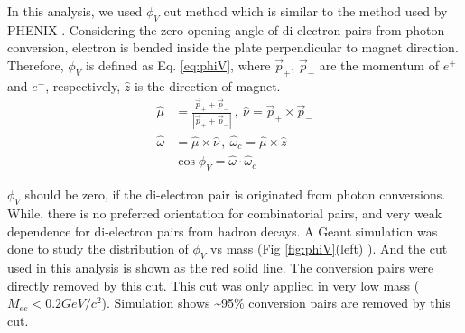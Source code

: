 In this analysis, we used $\phi_{V}$ cut method which is similar
to the method used by PHENIX \cite{PhysRevC.81.034911}. Considering
the zero opening angle of di-electron pairs from photon conversion,
electron is bended inside the plate perpendicular to magnet direction.
Therefore, $\phi_{V}$ is defined as Eq. \ref{eq:phiV}, where $\vec{p}_{+}$,
$\vec{p}_{-}$ are the momentum of $e^{+}$ and $e^{-}$, respectively,
$\hat{z}$ is the direction of magnet.
\begin{align}
\hat{\mu} & =\frac{\vec{p}_{+}+\vec{p}_{-}}{|\vec{p}_{+}+\vec{p}_{-}|}\,,\:\hat{\nu}=\vec{p}_{+}\times\vec{p}_{-}\nonumber \\
\hat{\omega} & =\hat{\mu}\times\hat{\nu}\,,\:\hat{\omega}_{c}=\hat{\mu}\times\hat{z}\label{eq:phiV}\\
 & \cos\phi_{V}=\hat{\omega}\cdot\hat{\omega}_{c}\nonumber 
\end{align}
 

$\phi_{V}$ should be zero, if the di-electron pair is originated
from photon conversions. While, there is no preferred orientation
for combinatorial pairs, and very weak dependence for di-electron
pairs from hadron decays. A Geant simulation was done to study the
distribution of $\phi_{V}$ vs mass (Fig \ref{fig:phiV}(left) \cite{:fv}).
And the cut used in this analysis is shown as the red solid line.
The conversion pairs were directly removed by this cut. This cut was
only applied in very low mass ($M_{ee}<0.2GeV/c^{2}$). Simulation
shows \textasciitilde{}95\% conversion pairs are removed by this cut.

